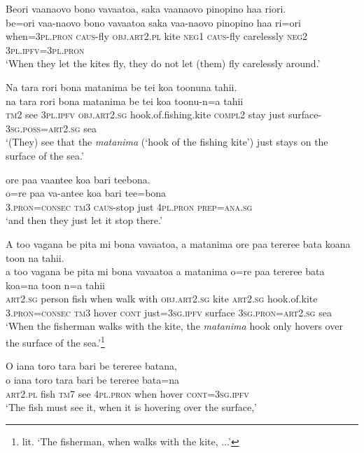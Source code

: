 \ea\label{ex:text27-12}
Beori vaanaovo bono vavaatoa, saka vaanaovo pinopino haa riori.\\
\gll be=ori	vaa-naovo	bono	vavaatoa	saka	vaa-naovo	pinopino	haa	ri=ori\\
     when=3\textsc{pl}.\textsc{pron}	\textsc{caus}-fly	\textsc{obj}.\textsc{art}2.\textsc{pl}	kite	\textsc{neg}1	\textsc{caus}-fly	carelessly	\textsc{neg}2	3\textsc{pl}.\textsc{ipfv}=3\textsc{pl}.\textsc{pron}\\
\glt `When they let the kites fly, they do not let (them) fly carelessly around.'
\z

\ea\label{ex:text27-13}
Na tara rori bona matanima be tei koa toonuna tahii.\\
\gll na	tara	rori	bona	matanima	be	tei	koa	toonu-n=a	tahii\\
     \textsc{tm}2	see	3\textsc{pl}.\textsc{ipfv}	\textsc{obj}.\textsc{art}2.\textsc{sg}	hook.of.fishing.kite	\textsc{compl}2	stay	just	surface-3\textsc{sg}.\textsc{poss}=\textsc{art}2.\textsc{sg}	sea\\
\glt `(They) see that the \textit{matanima} (`hook of the fishing kite') just stays on the surface of the sea.'
\z

\ea\label{ex:text27-14}
ore paa vaantee koa bari teebona.\\
\gll o=re	paa	va-antee	koa	bari	tee=bona\\
     3.\textsc{pron}=\textsc{consec}	\textsc{tm}3	\textsc{caus}-stop	just	4\textsc{pl}.\textsc{pron}	\textsc{prep}=\textsc{ana}.\textsc{sg}\\
\glt `and then they just let it stop there.'
\z

\ea\label{ex:text27-15}
A too vagana be pita mi bona vavaatoa, a matanima ore paa tereree bata koana toon na tahii.\\
\gll a	too	vagana	be	pita	mi	bona	vavaatoa	a	matanima	o=re	paa	tereree	bata	koa=na	toon	n=a	tahii\\
     \textsc{art}2.\textsc{sg}	person	fish	when	walk	with	\textsc{obj}.\textsc{art}2.\textsc{sg}	kite	\textsc{art}2.\textsc{sg}	hook.of.kite	3.\textsc{pron}=\textsc{consec}	\textsc{tm}3	hover	\textsc{cont}	just=3\textsc{sg}.\textsc{ipfv}	surface	3\textsc{sg}.\textsc{pron}=\textsc{art}2.\textsc{sg}	sea\\
\glt `When the fisherman walks with the kite, the \textit{matanima} hook only hovers over the surface of the sea.'\footnote{lit. `The fisherman, when walks with the kite, ...'}
\z

\ea\label{ex:text27-16}
O iana toro tara bari be tereree batana,\\
\gll o	iana	toro	tara	bari	be	tereree	bata=na\\
     \textsc{art}2.\textsc{pl}	fish	\textsc{tm}7	see	4\textsc{pl}.\textsc{pron}	when	hover	\textsc{cont}=3\textsc{sg}.\textsc{ipfv}\\
\glt `The fish must see it, when it is hovering over the surface,'
\z

